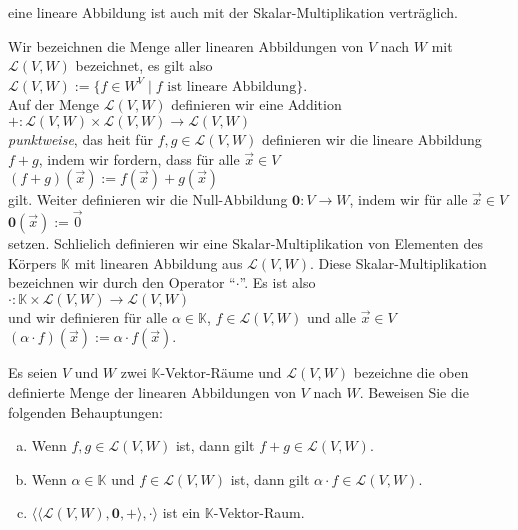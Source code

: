 \begin{Definition}[$\mathcal{L}(V, W)$]
\begin{enumerate}
      eine lineare Abbildung ist auch mit der Skalar-Multiplikation vertr\"{a}glich.
\end{enumerate}
Wir bezeichnen die Menge aller linearen Abbildungen von $V$ nach $W$ mit $\mathcal{L}(V, W)$ bezeichnet, es gilt also
\\[0.2cm]
\hspace*{1.3cm}
$\mathcal{L}(V, W) := \{ f \in W^V \mid \mbox{$f$ ist lineare Abbildung} \}$.
\\[0.2cm]
Auf der Menge $\mathcal{L}(V, W)$ definieren wir eine Addition
\\[0.2cm]
\hspace*{1.3cm}
$+: \mathcal{L}(V, W) \times \mathcal{L}(V, W) \rightarrow \mathcal{L}(V, W)$
\\[0.2cm]
\emph{\color{blue}punktweise}, das hei\3t f\"{u}r $f,g \in \mathcal{L}(V, W)$ definieren wir die lineare Abbildung $f+g$,
indem wir fordern, dass f\"{u}r alle $\vec{x} \in V$
\\[0.2cm]
\hspace*{1.3cm}
$(f+g)(\vec{x}) := f(\vec{x}) + g(\vec{x})$ 
\\[0.2cm]
gilt.  Weiter definieren wir die Null-Abbildung $\mathbf{0}: V \rightarrow W$, indem wir f\"{u}r alle
$\vec{x} \in V$
\\[0.2cm]
\hspace*{1.3cm}
$\mathbf{0}(\vec{x}) := \vec{0}$
\\[0.2cm]
setzen.  Schlie\3lich definieren wir eine Skalar-Multiplikation von Elementen des K\"{o}rpers
$\mathbb{K}$ mit linearen Abbildung aus $\mathcal{L}(V,W)$.  Diese Skalar-Multiplikation bezeichnen
wir durch den Operator ``$\cdot$''.  Es ist also
\\[0.2cm]
\hspace*{1.3cm}
$\cdot: \mathbb{K} \times \mathcal{L}(V, W) \rightarrow \mathcal{L}(V, W)$
\\[0.2cm]
und wir definieren f\"{u}r alle $\alpha \in \mathbb{K}$, $f \in \mathcal{L}(V, W)$ und alle $\vec{x} \in V$
\\[0.2cm]
\hspace*{1.3cm}
$(\alpha \cdot f)(\vec{x}) := \alpha \cdot f(\vec{x})$.
 \eoxs
\end{Definition}

\exercise
Es seien $V$ und $W$ zwei $\mathbb{K}$-Vektor-R\"{a}ume und $\mathcal{L}(V, W)$ bezeichne die oben
definierte Menge der linearen Abbildungen von $V$ nach $W$.  Beweisen Sie die folgenden Behauptungen:
\begin{enumerate}[(a)]
\item Wenn $f,g \in \mathcal{L}(V,W)$ ist,  dann gilt $f+g \in \mathcal{L}(V, W)$.
\item Wenn $\alpha \in \mathbb{K}$ und $f \in \mathcal{L}(V,W)$ ist,  dann gilt  $\alpha \cdot f \in \mathcal{L}(V, W)$.
\item $\bigl\langle \langle \mathcal{L}(V, W), \mathbf{0}, + \rangle, \cdot \rangle$ ist ein $\mathbb{K}$-Vektor-Raum.
      \eoxs
\end{enumerate}

